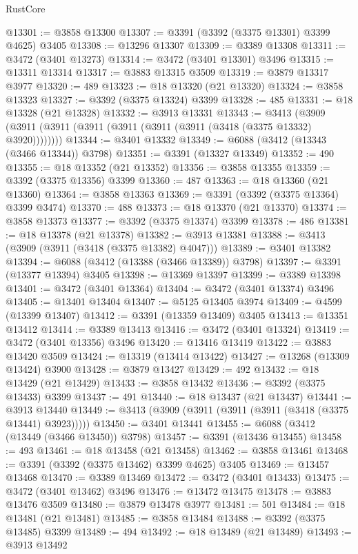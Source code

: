 \begin{lexlean}{RustCore}
\begin{coremodule}
@13301 := @3858 @13300
@13307 := @3391 (@3392 (@3375 @13301) @3399 @4625) @3405
@13308 := @13296 @13307
@13309 := @3389 @13308
@13311 := @3472 (@3401 @13273)
@13314 := @3472 (@3401 @13301) @3496
@13315 := @13311 @13314
@13317 := @3883 @13315 @3509
@13319 := @3879 @13317 @3977
@13320 := 489
@13323 := @18 @13320 (@21 @13320)
@13324 := @3858 @13323
@13327 := @3392 (@3375 @13324) @3399
@13328 := 485
@13331 := @18 @13328 (@21 @13328)
@13332 := @3913 @13331
@13343 := @3413 (@3909 (@3911 (@3911 (@3911 (@3911 (@3911 (@3911 (@3418 (@3375 @13332) @3920))))))))
@13344 := @3401 @13332
@13349 := @6088 (@3412 (@13343 (@3466 @13344)) @3798)
@13351 := @3391 (@13327 @13349)
@13352 := 490
@13355 := @18 @13352 (@21 @13352)
@13356 := @3858 @13355
@13359 := @3392 (@3375 @13356) @3399
@13360 := 487
@13363 := @18 @13360 (@21 @13360)
@13364 := @3858 @13363
@13369 := @3391 (@3392 (@3375 @13364) @3399 @3474)
@13370 := 488
@13373 := @18 @13370 (@21 @13370)
@13374 := @3858 @13373
@13377 := @3392 (@3375 @13374) @3399
@13378 := 486
@13381 := @18 @13378 (@21 @13378)
@13382 := @3913 @13381
@13388 := @3413 (@3909 (@3911 (@3418 (@3375 @13382) @4047)))
@13389 := @3401 @13382
@13394 := @6088 (@3412 (@13388 (@3466 @13389)) @3798)
@13397 := @3391 (@13377 @13394) @3405
@13398 := @13369 @13397
@13399 := @3389 @13398
@13401 := @3472 (@3401 @13364)
@13404 := @3472 (@3401 @13374) @3496
@13405 := @13401 @13404
@13407 := @5125 @13405 @3974
@13409 := @4599 (@13399 @13407)
@13412 := @3391 (@13359 @13409) @3405
@13413 := @13351 @13412
@13414 := @3389 @13413
@13416 := @3472 (@3401 @13324)
@13419 := @3472 (@3401 @13356) @3496
@13420 := @13416 @13419
@13422 := @3883 @13420 @3509
@13424 := @13319 (@13414 @13422)
@13427 := @13268 (@13309 @13424) @3900
@13428 := @3879 @13427
@13429 := 492
@13432 := @18 @13429 (@21 @13429)
@13433 := @3858 @13432
@13436 := @3392 (@3375 @13433) @3399
@13437 := 491
@13440 := @18 @13437 (@21 @13437)
@13441 := @3913 @13440
@13449 := @3413 (@3909 (@3911 (@3911 (@3911 (@3418 (@3375 @13441) @3923)))))
@13450 := @3401 @13441
@13455 := @6088 (@3412 (@13449 (@3466 @13450)) @3798)
@13457 := @3391 (@13436 @13455)
@13458 := 493
@13461 := @18 @13458 (@21 @13458)
@13462 := @3858 @13461
@13468 := @3391 (@3392 (@3375 @13462) @3399 @4625) @3405
@13469 := @13457 @13468
@13470 := @3389 @13469
@13472 := @3472 (@3401 @13433)
@13475 := @3472 (@3401 @13462) @3496
@13476 := @13472 @13475
@13478 := @3883 @13476 @3509
@13480 := @3879 @13478 @3977
@13481 := 501
@13484 := @18 @13481 (@21 @13481)
@13485 := @3858 @13484
@13488 := @3392 (@3375 @13485) @3399
@13489 := 494
@13492 := @18 @13489 (@21 @13489)
@13493 := @3913 @13492

\end{coremodule}
\end{lexlean}
